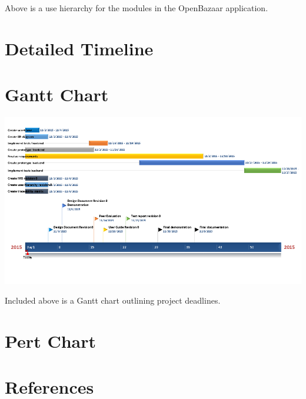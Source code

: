\documentclass{article}
\begin{document}
Above is a use hierarchy for the modules in the OpenBazaar application.
\section*{Detailed Timeline}

\section*{Gantt Chart}
\includegraphics{gantt_chart}

Included above is a Gantt chart outlining project deadlines.
\section*{Pert Chart}

\section*{References}
\end{document}
